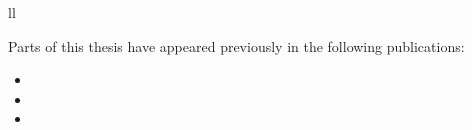 \documentclass[
11pt, %
english, %
singlespacing, %
headsepline, %
]{MastersDoctoralThesis_updated} %
\begin{document}

\begin{abstract}
    \addchaptertocentry{\abstractname}
    
\end{abstract}


\begin{acknowledgements}
    \addchaptertocentry{\acknowledgementname}
    
\end{acknowledgements}


\tableofcontents

\listoffigures



\begin{abbreviations}{ll} 



\end{abbreviations}




\begin{declaration}
\addchaptertocentry{\authorshipname} %
\noindent Parts of this thesis have appeared previously in the following publications:

\begin{itemize} 
  \item {}
  \item {}
  \item {}
\end{itemize}

\end{declaration}
\end{document}

